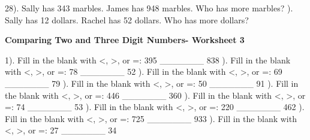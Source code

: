 \documentclass{article}%
\begin{document}
28). Sally has 343 marbles. James has 948 marbles. Who has more marbles?%
\newline%
\newline%
). Sally has 12 dollars. Rachel has 52 dollars. Who has more dollars?%
\newline%
\newline%
\newline%
\pagebreak%
\large%
\begin{center}%
\textbf{Comparing Two and Three Digit Numbers- Worksheet 3}%
\newline%
\newline%
\newline%
\end{center} \normalsize%
1). Fill in the blank with <, >, or =: 395 \_\_\_\_\_\_\_ 838%
\newline%
\newline%
). Fill in the blank with <, >, or =: 78 \_\_\_\_\_\_\_ 52%
\newline%
\newline%
). Fill in the blank with <, >, or =: 69 \_\_\_\_\_\_\_ 79%
\newline%
\newline%
). Fill in the blank with <, >, or =: 50 \_\_\_\_\_\_\_ 91%
\newline%
\newline%
). Fill in the blank with <, >, or =: 446 \_\_\_\_\_\_\_ 360%
\newline%
\newline%
). Fill in the blank with <, >, or =: 74 \_\_\_\_\_\_\_ 53%
\newline%
\newline%
). Fill in the blank with <, >, or =: 220 \_\_\_\_\_\_\_ 462%
\newline%
\newline%
). Fill in the blank with <, >, or =: 725 \_\_\_\_\_\_\_ 933%
\newline%
\newline%
). Fill in the blank with <, >, or =: 27 \_\_\_\_\_\_\_ 34%
\newline%
\end{document}
